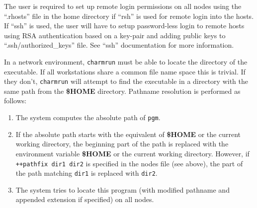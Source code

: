 The user is required to set up remote login permissions on all nodes
using the ``.rhosts'' file in the home directory if ``rsh'' is used for remote
login into the hosts. If ``ssh'' is used, the user will have to setup
password-less login to remote hosts using
RSA authentication based on a key-pair and adding public keys to 
``.ssh/authorized\_keys'' file. See ``ssh'' documentation for more information.

In a network environment, {\tt charmrun} must
be able to locate the directory of the executable.  If all workstations
share a common file name space this is trivial.  If they don't, {\tt charmrun}
will attempt to find the executable in a directory with the same path
from the {\bf \$HOME} directory.  Pathname resolution is performed as 
follows:
\begin{enumerate}
	\item The system computes the absolute path of {\tt pgm}.
	\item If the absolute path starts with the equivalent of {\bf \$HOME} 
	or the current working directory, the beginning part of the 
        path 
	is replaced with the environment variable {\bf \$HOME} or the 
	current working directory. However, if {\tt ++pathfix dir1 dir2} is 
        specified in the nodes file (see above), the part of
        the path matching {\tt dir1} is replaced with {\tt dir2}.
	\item The system tries to locate this program (with modified 
	pathname and appended extension if specified) on all nodes.
\end{enumerate}

